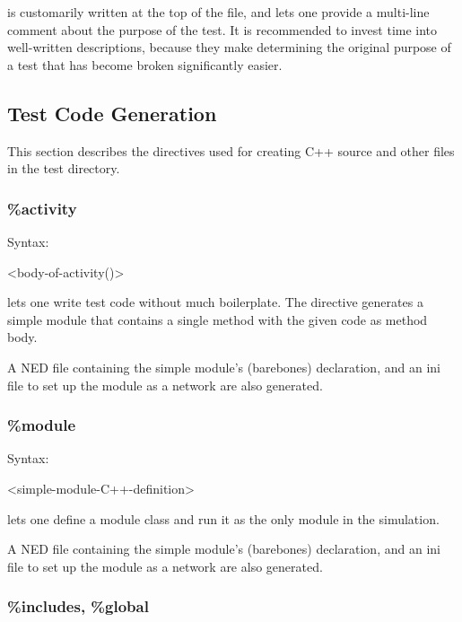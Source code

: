  is customarily written at the top of the 
file, and lets one provide a multi-line comment about the purpose of the
test. It is recommended to invest time into well-written descriptions,
because they make determining the original purpose of a test that has
become broken significantly easier.


\subsection{Test Code Generation}
\label{sec:testing:opptest:test-code-generation}

This section describes the directives used for creating C++ source and
other files in the test directory.

\subsubsection{\%activity}
\label{sec:testing:opptest:activity}

Syntax:

\begin{filelisting}
<body-of-activity()>
\end{filelisting}

 lets one write test code without much boilerplate. The
directive generates a simple module that contains a single 
method with the given code as method body.

A NED file containing the simple module's (barebones) declaration, and an
ini file to set up the module as a network are also generated.


\subsubsection{\%module}
\label{sec:testing:opptest:module}

Syntax:

\begin{filelisting}
<simple-module-C++-definition>
\end{filelisting}

 lets one define a module class and run it as the only module
in the simulation.

A NED file containing the simple module's (barebones) declaration, and an
ini file to set up the module as a network are also generated.


\subsubsection{\%includes, \%global}
\label{sec:testing:opptest:includes-and-global}

